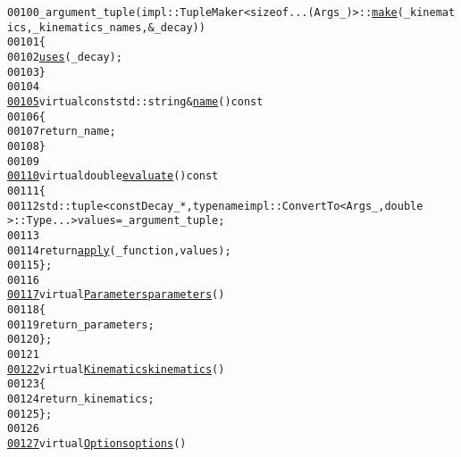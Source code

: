 \begin{footnotesize}
\begin{alltt}
00100                 \_argument\_tuple(impl::TupleMaker<sizeof...(Args\_)>::\hyperlink{classeos_1_1Observable_a949bf84938bcc9ab75075801c636763c}{make}(\_kinemat
      ics, \_kinematics\_names, &\_decay))
00101             \{
00102                 \hyperlink{classeos_1_1ParameterUser_ad91a901e589653272482bded7e453c70}{uses}(\_decay);
00103             \}
00104 
\hypertarget{concrete__observable_8hh_source_l00105}{}\hyperlink{classeos_1_1ConcreteObservable_a777d479052396c8dc1b73f752fdb3539}{00105}             \textcolor{keyword}{virtual} \textcolor{keyword}{const} std::string & \hyperlink{classeos_1_1ConcreteObservable_a777d479052396c8dc1b73f752fdb3539}{name}()\textcolor{keyword}{ const}
00106 \textcolor{keyword}{            }\{
00107                 \textcolor{keywordflow}{return} \_name;
00108             \}
00109 
\hypertarget{concrete__observable_8hh_source_l00110}{}\hyperlink{classeos_1_1ConcreteObservable_a4127e180162b8f5eeebd55e7c8d1b7cf}{00110}             \textcolor{keyword}{virtual} \textcolor{keywordtype}{double} \hyperlink{classeos_1_1ConcreteObservable_a4127e180162b8f5eeebd55e7c8d1b7cf}{evaluate}()\textcolor{keyword}{ const}
00111 \textcolor{keyword}{            }\{
00112                 std::tuple<const Decay\_ *, typename impl::ConvertTo<Args\_, double
      >::Type ...> values = \_argument\_tuple;
00113 
00114                 \textcolor{keywordflow}{return} \hyperlink{namespaceeos_a6d6ca72f35614029a62c270ec042d80c}{apply}(\_function, values);
00115             \};
00116 
\hypertarget{concrete__observable_8hh_source_l00117}{}\hyperlink{classeos_1_1ConcreteObservable_af5265ce9314987a7b7b01275b5410309}{00117}             \textcolor{keyword}{virtual} \hyperlink{classeos_1_1Parameters}{Parameters} \hyperlink{classeos_1_1ConcreteObservable_af5265ce9314987a7b7b01275b5410309}{parameters}()
00118             \{
00119                 \textcolor{keywordflow}{return} \_parameters;
00120             \};
00121 
\hypertarget{concrete__observable_8hh_source_l00122}{}\hyperlink{classeos_1_1ConcreteObservable_abffd48fad6c67448f99c2024a6c81ad7}{00122}             \textcolor{keyword}{virtual} \hyperlink{classeos_1_1Kinematics}{Kinematics} \hyperlink{classeos_1_1ConcreteObservable_abffd48fad6c67448f99c2024a6c81ad7}{kinematics}()
00123             \{
00124                 \textcolor{keywordflow}{return} \_kinematics;
00125             \};
00126 
\hypertarget{concrete__observable_8hh_source_l00127}{}\hyperlink{classeos_1_1ConcreteObservable_ac8f34b0c5dc087982bf0d7b053cf07b5}{00127}             \textcolor{keyword}{virtual} \hyperlink{classeos_1_1Options}{Options} \hyperlink{classeos_1_1ConcreteObservable_ac8f34b0c5dc087982bf0d7b053cf07b5}{options}()

\end{alltt}
\end{footnotesize}
